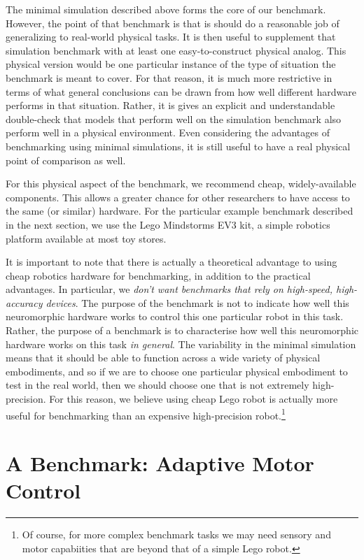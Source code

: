 \documentclass{frontiersSCNS} %
\begin{document}
The minimal simulation described above forms the core of our benchmark.
However, the point of that benchmark is that is should do a reasonable job
of generalizing to real-world physical tasks.  It is then useful to
supplement that simulation benchmark with at least one easy-to-construct 
physical analog.  This physical version would be one particular instance of the
type of situation the benchmark is meant to cover.  For that reason, it
is much more restrictive in terms of what general conclusions can be drawn
from how well different hardware performs in that situation.  Rather, it is
gives an explicit and understandable double-check that models that perform
well on the simulation benchmark also perform well in a physical environment.
Even considering the advantages of benchmarking using minimal simulations,
it is still useful to have a real physical point of comparison as well.

For this physical aspect of the benchmark, we recommend cheap, widely-available
components.  This allows a greater chance for other researchers to have
access to the same (or similar) hardware.  For the particular example 
benchmark described in the next section, we use the Lego Mindstorms EV3 kit,
a simple robotics platform available at most toy stores.

It is important to note that there is actually a theoretical advantage to
using cheap robotics hardware for benchmarking, in addition to the practical
advantages.  In particular, we \emph{don't want benchmarks that rely on
high-speed, high-accuracy devices}.  The purpose of the benchmark
is not to indicate how well this neuromorphic hardware works to control this
one particular robot in this task.  Rather, the purpose of a benchmark is to
characterise how well this neuromorphic hardware works on this task 
\emph{in general}.  The variability in the minimal simulation means that it
should be able to function across a wide variety of physical embodiments, and
so if we are to choose one particular physical embodiment to test in the
real world, then we should choose one that is not extremely high-precision.
For this reason, we believe using cheap Lego robot is actually more useful
for benchmarking than an expensive high-precision robot.\footnote{Of course,
for more complex benchmark tasks we may need sensory and motor capabiities
that are beyond that of a simple Lego robot.}

\section{A Benchmark: Adaptive Motor Control}
\end{document}
